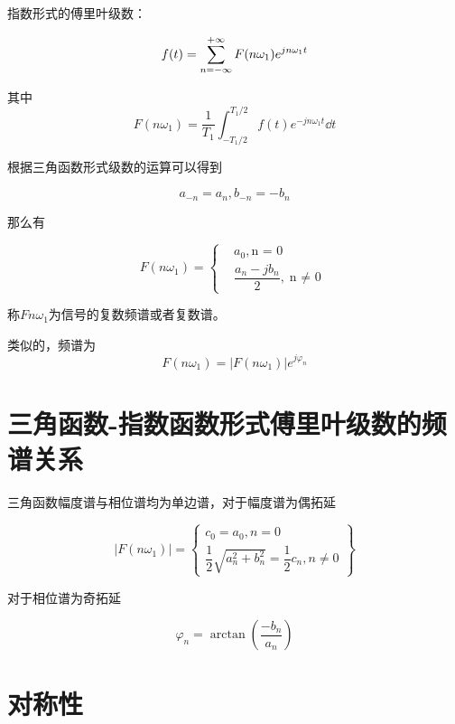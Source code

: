 \documentclass[cn,11pt,chinese,black,simple]{../elegantbook}
\begin{document}
指数形式的傅里叶级数：

\[f(t) = \displaystyle\sum_{n=-\infty}^{+\infty} F(n\omega_1) e^{j n \omega_1 t}\]

其中
\[F(n\omega_1) = \dfrac{1}{T_1} \int_{-T_1/2}^{T_1/2} f(t) e^{-j n \omega_1 t} \dd{t}\]

根据三角函数形式级数的运算可以得到

\[a_{-n} = a_n, b_{-n} = -b_n\]

那么有

\[F(n \omega_1) = \left\{
\begin{aligned}
  & a_0, \text{n = 0}\\
  & \dfrac{a_n - j b_n}{2}, \text{n \(\neq\) 0}
\end{aligned}\right.
\]

称\(F{n\omega_1}\)为信号的复数频谱或者复数谱。

类似的，频谱为
\[ F(n \omega_1) = |F(n \omega_1)| e^{j \varphi_n} \]

\section{三角函数-指数函数形式傅里叶级数的频谱关系}

三角函数幅度谱与相位谱均为单边谱，对于幅度谱为偶拓延

\[ 
|F(n \omega_1)| = \left\{\begin{aligned}
  c_0 = a_0, n = 0 \\
  \dfrac{1}{2} \sqrt{a_n^2 + b_n^2} = \dfrac{1}{2} c_n , n \neq 0
\end{aligned}\right\}
\]

对于相位谱为奇拓延

\[
\varphi_n = \arctan (\dfrac{-b_n}{a_n})  
\]

\section{对称性}
\end{document}
